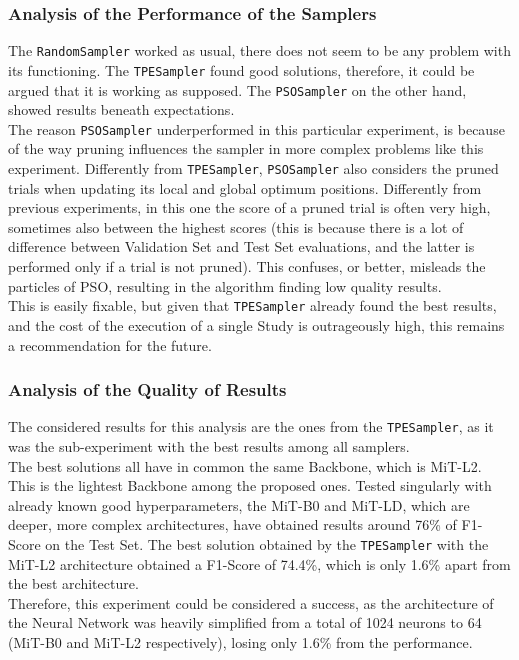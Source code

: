 \subsubsection{Analysis of the Performance of the Samplers}

The \texttt{RandomSampler} worked as usual, there does not seem to be any problem with its functioning. The \texttt{TPESampler} found good solutions, therefore, it could be argued that it is working as supposed. The \texttt{PSOSampler} on the other hand, showed results beneath expectations.
\\[0.3cm]The reason \texttt{PSOSampler} underperformed in this particular experiment, is because of the way pruning influences the sampler in more complex problems like this experiment.
Differently from \texttt{TPESampler}, \texttt{PSOSampler} also considers the pruned trials when updating its local and global optimum positions. Differently from previous experiments, in this one the score of a pruned trial is often very high, sometimes also between the highest scores (this is because there is a lot of difference between Validation Set and Test Set evaluations, and the latter is performed only if a trial is not pruned). This confuses, or better, misleads the particles of PSO, resulting in the algorithm finding low quality results.
\\[0.3cm]This is easily fixable, but given that \texttt{TPESampler} already found the best results, and the cost of the execution of a single Study is outrageously high, this remains a recommendation for the future.

\subsubsection{Analysis of the Quality of Results}

The considered results for this analysis are the ones from the \texttt{TPESampler}, as it was the sub-experiment with the best results among all samplers.
\\[0.3cm]The best solutions all have in common the same Backbone, which is MiT-L2. This is the lightest Backbone among the proposed ones.
Tested singularly with already known good hyperparameters, the MiT-B0 and MiT-LD, which are deeper, more complex architectures, have obtained results around 76\% of F1-Score on the Test Set.
The best solution obtained by the \texttt{TPESampler} with the MiT-L2 architecture obtained a F1-Score of 74.4\%, which is only 1.6\% apart from the best architecture.
\\[0.3cm]Therefore, this experiment could be considered a success, as the architecture of the Neural Network was heavily simplified from a total of 1024 neurons to 64 (MiT-B0 and MiT-L2 respectively), losing only 1.6\% from the performance.




